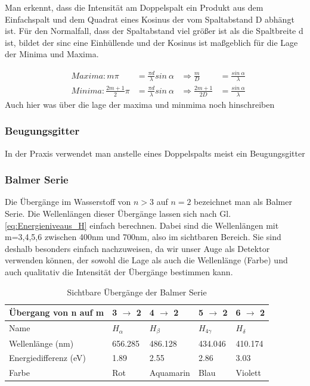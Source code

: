 \documentclass[]{article}
\begin{document}
Man erkennt, dass die Intensität am Doppelspalt ein Produkt aus dem Einfachspalt und dem Quadrat eines Kosinus der vom Spaltabstand D abhängt ist. Für den Normalfall, dass der Spaltabstand viel größer ist als die Spaltbreite d ist, bildet der sinc eine Einhüllende und der Kosinus ist maßgeblich für die Lage der Minima und Maxima.

\begin{align}
	&Maxima: m\pi&=\frac{\pi d}{\lambda}sin \: \alpha &\Rightarrow \frac{m}{D}&= \frac {sin \: \alpha}{\lambda } \\
	&Minima: \frac{2m+1}{2}\pi&=\frac{\pi d}{\lambda}sin \: \alpha &\Rightarrow \frac{2m+1}{2D}&=\frac{sin \: \alpha}{\lambda}	
\end{align}
Auch hier was über die lage der maxima und minmima noch hinschreiben



\subsubsection{Beugungsgitter}
In der Praxis verwendet man anstelle eines Doppelspalts meist ein Beugungsgitter

\subsubsection{Balmer Serie}
Die Übergänge im Wasserstoff von $n>3$ auf $n=2$ bezeichnet man als Balmer Serie. Die Wellenlängen dieser Übergänge lassen sich nach Gl. \ref{eq:Energieniveaus_H} einfach berechnen. Dabei sind die Wellenlängen mit m=3,4,5,6 zwischen 400nm und 700nm, also im sichtbaren Bereich. Sie sind deshalb besonders einfach nachzuweisen, da wir unser Auge als Detektor verwenden können, der sowohl die Lage als auch die Wellenlänge (Farbe) und auch qualitativ die Intensität der Übergänge bestimmen kann.
\begin{table}[!ht]
	\centering
	\caption{Sichtbare Übergänge der Balmer Serie}
	\label{my-label}
	\begin{tabular}{|l|l|l|l|l|}
		\hline
		Übergang von n auf m  & 3 $\rightarrow$  2 & 4 $\rightarrow$ 2 & 5 $\rightarrow$ 2 & 6 $  \rightarrow$ 2 \\ \hline
		Name                  & $H_{\alpha }$      & $H_{\beta}$        & $H_{4\gamma }$      & $H_{\delta}$       \\ \hline
		Wellenlänge (nm)      & 656.285                      & 486.128                      & 434.046                       & 410.174                        \\ \hline
		Energiedifferenz (eV) & 1.89                           & 2.55                           & 2.86                           & 3.03                           \\ \hline
		Farbe                 & Rot                            & Aquamarin                      & Blau                           & Violett                        \\ \hline

	\end{tabular}
\end{table}
\end{document}
